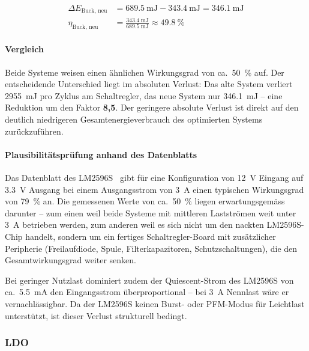 \documentclass[12pt,a4paper]{article}
\begin{document}
	\begin{align}
		\Delta E_{\text{Buck, neu}} &= \SI{689.5}{\milli\joule} - \SI{343.4}{\milli\joule} = \SI{346.1}{\milli\joule} \\
		\eta_{\text{Buck, neu}} &= \frac{\SI{343.4}{\milli\joule}}{\SI{689.5}{\milli\joule}} \approx \SI{49.8}{\percent}
	\end{align}

	\paragraph{Vergleich}

	Beide Systeme weisen einen ähnlichen Wirkungsgrad von ca.\ \SI{50}{\percent} auf.
	Der entscheidende Unterschied liegt im absoluten Verlust: Das alte System verliert \SI{2955}{\milli\joule} pro Zyklus am Schaltregler, das neue System nur \SI{346.1}{\milli\joule} -- eine Reduktion um den Faktor \textbf{8,5}.
	Der geringere absolute Verlust ist direkt auf den deutlich niedrigeren Gesamtenergieverbrauch des optimierten Systems zurückzuführen.

	\paragraph{Plausibilitätsprüfung anhand des Datenblatts}

	Das Datenblatt des LM2596S~\cite{lm2596_datasheet} gibt für eine Konfiguration von \SI{12}{\volt} Eingang auf \SI{3.3}{\volt} Ausgang bei einem Ausgangsstrom von \SI{3}{\ampere} einen typischen Wirkungsgrad von \SI{79}{\percent} an.
	Die gemessenen Werte von ca.\ \SI{50}{\percent} liegen erwartungsgemäss darunter -- zum einen weil beide Systeme mit mittleren Lastströmen weit unter \SI{3}{\ampere} betrieben werden, zum anderen weil es sich nicht um den nackten LM2596S-Chip handelt, sondern um ein fertiges Schaltregler-Board mit zusätzlicher Peripherie (Freilaufdiode, Spule, Filterkapazitoren, Schutzschaltungen), die den Gesamtwirkungsgrad weiter senken.

	Bei geringer Nutzlast dominiert zudem der Quiescent-Strom des LM2596S von ca.\ \SI{5.5}{\milli\ampere} den Eingangsstrom überproportional -- bei \SI{3}{\ampere} Nennlast wäre er vernachlässigbar.
	Da der LM2596S keinen Burst- oder PFM-Modus für Leichtlast unterstützt, ist dieser Verlust strukturell bedingt.
	\subsubsection{LDO}\label{sub:ldo}
\end{document}
